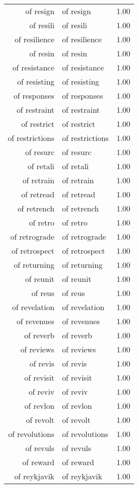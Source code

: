 \begin{table}[ht]
\begin{tabular}{rlr}
  of resign & of resign & 1.00 \\ 
  of resili & of resili & 1.00 \\ 
  of resilience & of resilience & 1.00 \\ 
  of resin & of resin & 1.00 \\ 
  of resistance & of resistance & 1.00 \\ 
  of resisting & of resisting & 1.00 \\ 
  of responses & of responses & 1.00 \\ 
  of restraint & of restraint & 1.00 \\ 
  of restrict & of restrict & 1.00 \\ 
  of restrictions & of restrictions & 1.00 \\ 
  of resurc & of resurc & 1.00 \\ 
  of retali & of retali & 1.00 \\ 
  of retrain & of retrain & 1.00 \\ 
  of retread & of retread & 1.00 \\ 
  of retrench & of retrench & 1.00 \\ 
  of retro & of retro & 1.00 \\ 
  of retrograde & of retrograde & 1.00 \\ 
  of retrospect & of retrospect & 1.00 \\ 
  of returning & of returning & 1.00 \\ 
  of reunit & of reunit & 1.00 \\ 
  of reus & of reus & 1.00 \\ 
  of revelation & of revelation & 1.00 \\ 
  of revenues & of revenues & 1.00 \\ 
  of reverb & of reverb & 1.00 \\ 
  of reviews & of reviews & 1.00 \\ 
  of revis & of revis & 1.00 \\ 
  of revisit & of revisit & 1.00 \\ 
  of reviv & of reviv & 1.00 \\ 
  of revlon & of revlon & 1.00 \\ 
  of revolt & of revolt & 1.00 \\ 
  of revolutions & of revolutions & 1.00 \\ 
  of revuls & of revuls & 1.00 \\ 
  of reward & of reward & 1.00 \\ 
  of reykjavik & of reykjavik & 1.00 \\ 

\end{tabular}
\end{table}
